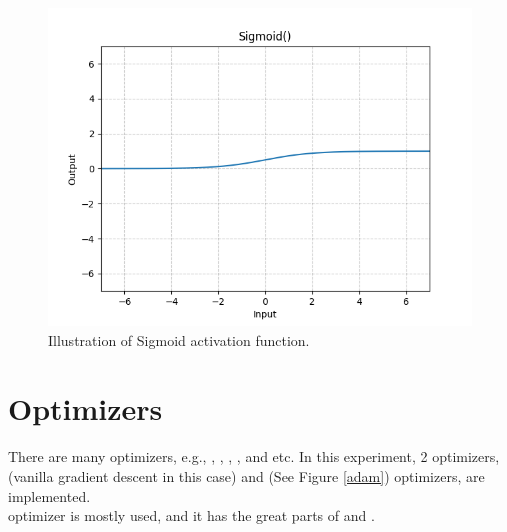     \begin{figure}[H]
		\centering
		\includegraphics[scale=0.5]{img/sigmoid.png}
		\caption{Illustration of Sigmoid activation function.}
		\label{sigmoid}
	\end{figure}

\section{Optimizers}
\indent
    There are many optimizers, e.g., , , , , and etc.
    In this experiment, 2 optimizers,  (vanilla gradient descent in this case) and  (See Figure \ref{adam}) optimizers, are implemented. \\
     optimizer is mostly used, and it has the great parts of  and .

